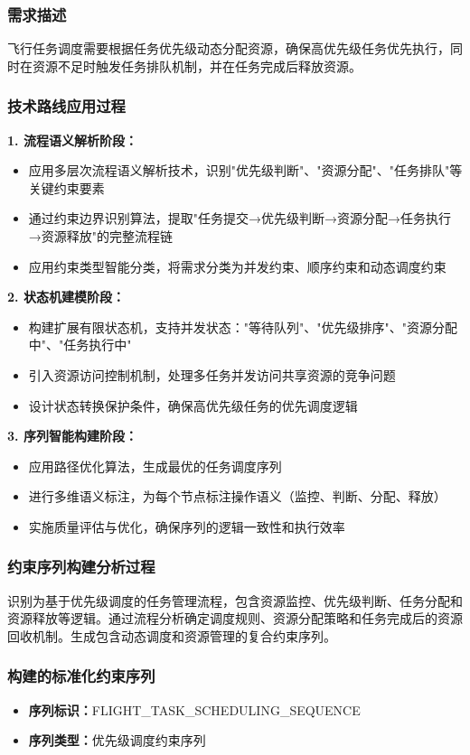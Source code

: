 \documentclass[fontset=windows]{article}
\begin{document}
\subsubsection{需求描述}
飞行任务调度需要根据任务优先级动态分配资源，确保高优先级任务优先执行，同时在资源不足时触发任务排队机制，并在任务完成后释放资源。

\subsubsection{技术路线应用过程}
\textbf{1. 流程语义解析阶段：}
\begin{itemize}
    \item 应用多层次流程语义解析技术，识别"优先级判断"、"资源分配"、"任务排队"等关键约束要素
    \item 通过约束边界识别算法，提取"任务提交→优先级判断→资源分配→任务执行→资源释放"的完整流程链
    \item 应用约束类型智能分类，将需求分类为并发约束、顺序约束和动态调度约束
\end{itemize}

\textbf{2. 状态机建模阶段：}
\begin{itemize}
    \item 构建扩展有限状态机，支持并发状态："等待队列"、"优先级排序"、"资源分配中"、"任务执行中"
    \item 引入资源访问控制机制，处理多任务并发访问共享资源的竞争问题
    \item 设计状态转换保护条件，确保高优先级任务的优先调度逻辑
\end{itemize}

\textbf{3. 序列智能构建阶段：}
\begin{itemize}
    \item 应用路径优化算法，生成最优的任务调度序列
    \item 进行多维语义标注，为每个节点标注操作语义（监控、判断、分配、释放）
    \item 实施质量评估与优化，确保序列的逻辑一致性和执行效率
\end{itemize}

\subsubsection{约束序列构建分析过程}
识别为基于优先级调度的任务管理流程，包含资源监控、优先级判断、任务分配和资源释放等逻辑。通过流程分析确定调度规则、资源分配策略和任务完成后的资源回收机制。生成包含动态调度和资源管理的复合约束序列。

\subsubsection{构建的标准化约束序列}
\begin{itemize}
    \item \textbf{序列标识：}FLIGHT\_TASK\_SCHEDULING\_SEQUENCE
    \item \textbf{序列类型：}优先级调度约束序列
\end{itemize}
\end{document}
